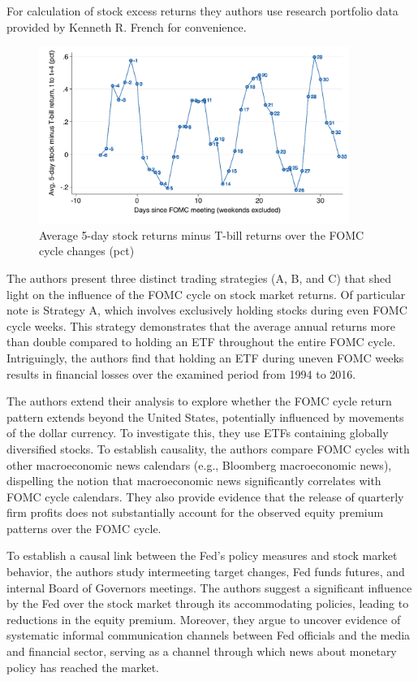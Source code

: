 For calculation of stock excess returns they authors use research portfolio data provided by Kenneth R. French for convenience.  \parencite{kenneth_r_kenneth_nodate}


\begin{figure}[h]
    \centering
    \includegraphics[width=0.9\textwidth]{figures/cies19/fig1}
    \caption{Average 5-day stock returns minus T-bill returns over the FOMC cycle changes (pct) \parencite{cieslak_stock_2019} }
\end{figure}

The authors present three distinct trading strategies (A, B, and C) that shed light on the influence of the FOMC cycle on stock market returns. Of particular note is Strategy A, which involves exclusively holding stocks during even FOMC cycle weeks. This strategy demonstrates that the average annual returns more than double compared to holding an ETF throughout the entire FOMC cycle. Intriguingly, the authors find that holding an ETF during uneven FOMC weeks results in financial losses over the examined period from 1994 to 2016.

The authors extend their analysis to explore whether the FOMC cycle return pattern extends beyond the United States, potentially influenced by movements of the dollar currency. To investigate this, they use ETFs containing globally diversified stocks. To establish causality, the authors compare FOMC cycles with other macroeconomic news calendars (e.g., Bloomberg macroeconomic news), dispelling the notion that macroeconomic news significantly correlates with FOMC cycle calendars. They also provide evidence that the release of quarterly firm profits does not substantially account for the observed equity premium patterns over the FOMC cycle.

To establish a causal link between the Fed's policy measures and stock market behavior, the authors study intermeeting target changes, Fed funds futures, and internal Board of Governors meetings. The authors suggest a significant influence by the Fed over the stock market through its accommodating policies, leading to reductions in the equity premium. Moreover, they argue to uncover evidence of systematic informal communication channels between Fed officials and the media and financial sector, serving as a channel through which news about monetary policy has reached the market.

